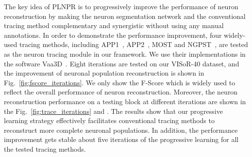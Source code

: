 The key idea of PLNPR is to progressively improve the performance of neuron reconstruction by making the neuron segmentation network and the conventional tracing method complementary and synergistic without using any manual annotations.
In order to demonstrate the performance improvement, four widely-used tracing methods, including APP1~\cite{Peng2011}, APP2~\cite{Xiao2013}, MOST\cite{Wu2014} and NGPST~\cite{Quan2015}, are tested as the neuron tracing module in our framework. 
We use their implementations in the software Vaa3D~\cite{Peng2014}. 
%
Eight iterations are tested on our VISoR-40 dataset, and the improvement of neuronal population reconstruction is shown in Fig.~\ref{fig:fscore_iterations}.
We only show the F-Score which is widely used to reflect the overall performance of neuron reconstruction.
%
Moreover, the neuron reconstruction performance on a testing block at different iterations are shown in the Fig.~\ref{fig:trace_iterations} and .
%
The results show that our progressive learning strategy effectively facilitates conventional tracing methods to reconstruct more complete neuronal populations.
In addition, the performance improvement gets stable about five iterations of the progressive learning for all the tested tracing methods. 

